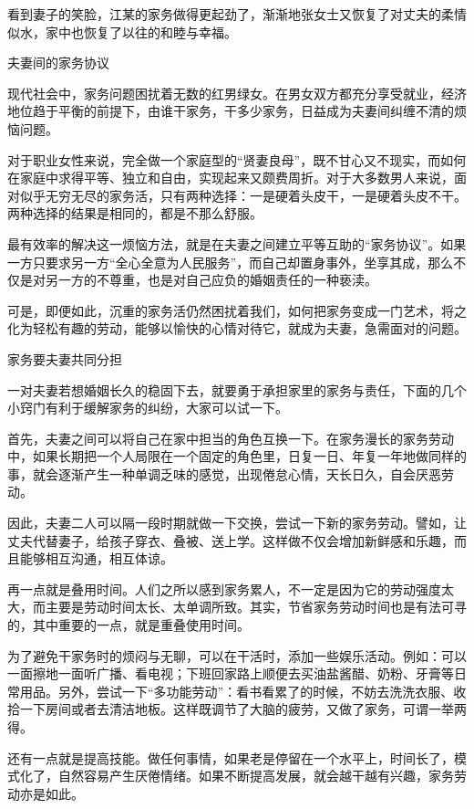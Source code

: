 \documentclass[12pt,UTF8]{ctexbook}
\begin{document}
看到妻子的笑脸，江某的家务做得更起劲了，渐渐地张女士又恢复了对丈夫的柔情似水，家中也恢复了以往的和睦与幸福。





夫妻间的家务协议


现代社会中，家务问题困扰着无数的红男绿女。在男女双方都充分享受就业，经济地位趋于平衡的前提下，由谁干家务，干多少家务，日益成为夫妻间纠缠不清的烦恼问题。

对于职业女性来说，完全做一个家庭型的“贤妻良母”，既不甘心又不现实，而如何在家庭中求得平等、独立和自由，实现起来又颇费周折。对于大多数男人来说，面对似乎无穷无尽的家务活，只有两种选择：一是硬着头皮干，一是硬着头皮不干。两种选择的结果是相同的，都是不那么舒服。

最有效率的解决这一烦恼方法，就是在夫妻之间建立平等互助的“家务协议”。如果一方只要求另一方“全心全意为人民服务”，而自己却置身事外，坐享其成，那么不仅是对另一方的不尊重，也是对自己应负的婚姻责任的一种亵渎。

可是，即便如此，沉重的家务活仍然困扰着我们，如何把家务变成一门艺术，将之化为轻松有趣的劳动，能够以愉快的心情对待它，就成为夫妻，急需面对的问题。





家务要夫妻共同分担


一对夫妻若想婚姻长久的稳固下去，就要勇于承担家里的家务与责任，下面的几个小窍门有利于缓解家务的纠纷，大家可以试一下。

首先，夫妻之间可以将自己在家中担当的角色互换一下。在家务漫长的家务劳动中，如果长期把一个人局限在一个固定的角色里，日复一日、年复一年地做同样的事，就会逐渐产生一种单调乏味的感觉，出现倦怠心情，天长日久，自会厌恶劳动。

因此，夫妻二人可以隔一段时期就做一下交换，尝试一下新的家务劳动。譬如，让丈夫代替妻子，给孩子穿衣、叠被、送上学。这样做不仅会增加新鲜感和乐趣，而且能够相互沟通，相互体谅。

再一点就是叠用时间。人们之所以感到家务累人，不一定是因为它的劳动强度太大，而主要是劳动时间太长、太单调所致。其实，节省家务劳动时间也是有法可寻的，其中重要的一点，就是重叠使用时间。

为了避免干家务时的烦闷与无聊，可以在干活时，添加一些娱乐活动。例如：可以一面擦地一面听广播、看电视；下班回家路上顺便去买油盐酱醋、奶粉、牙膏等日常用品。另外，尝试一下“多功能劳动”：看书看累了的时候，不妨去洗洗衣服、收拾一下房间或者去清洁地板。这样既调节了大脑的疲劳，又做了家务，可谓一举两得。

还有一点就是提高技能。做任何事情，如果老是停留在一个水平上，时间长了，模式化了，自然容易产生厌倦情绪。如果不断提高发展，就会越干越有兴趣，家务劳动亦是如此。
\end{document}
